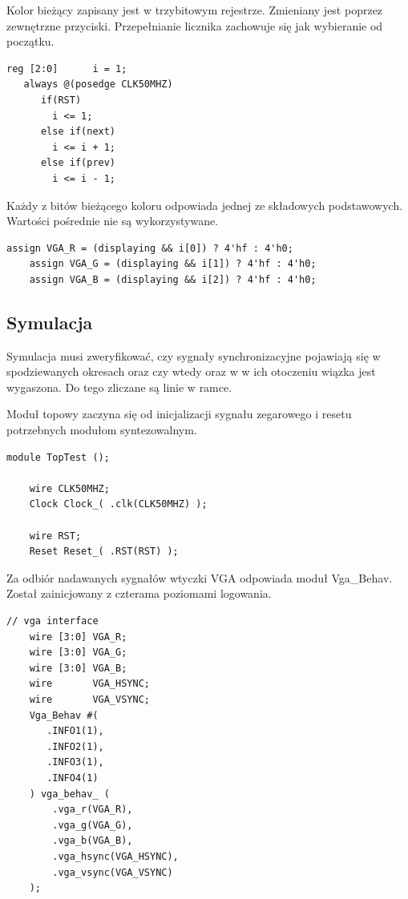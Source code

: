 \documentclass[a4paper,12pt]{article}
\begin{document}
Kolor bieżący zapisany jest w trzybitowym rejestrze. Zmieniany jest poprzez zewnętrzne przyciski. Przepełnianie licznika zachowuje się jak wybieranie od początku.
\begin{lstlisting}[label=Syncvga,caption=Sync.v,firstnumber=16]
   reg [2:0]      i = 1;
   always @(posedge CLK50MHZ)
      if(RST)
        i <= 1;
      else if(next)
        i <= i + 1;
      else if(prev)
        i <= i - 1;
\end{lstlisting}

Każdy z bitów bieżącego koloru odpowiada jednej ze składowych podstawowych. Wartości pośrednie nie są wykorzystywane.
\begin{lstlisting}[label=Syncvga,caption=Sync.v,firstnumber=25]
    assign VGA_R = (displaying && i[0]) ? 4'hf : 4'h0;
    assign VGA_G = (displaying && i[1]) ? 4'hf : 4'h0;
    assign VGA_B = (displaying && i[2]) ? 4'hf : 4'h0;
\end{lstlisting}

\subsection{Symulacja}
Symulacja musi zweryfikować, czy sygnały synchronizacyjne pojawiają się w spodziewanych okresach oraz czy wtedy oraz w w ich otoczeniu wiązka jest wygaszona. Do tego zliczane są linie w ramce.

Moduł topowy zaczyna się od inicjalizacji sygnału zegarowego i resetu potrzebnych modułom syntezowalnym.
\begin{lstlisting}[label=Syncvga,caption=Sync.v,firstnumber=3]
module TopTest ();

    wire CLK50MHZ;
    Clock Clock_( .clk(CLK50MHZ) );

    wire RST;
    Reset Reset_( .RST(RST) );
\end{lstlisting}

Za odbiór nadawanych sygnałów wtyczki VGA odpowiada moduł Vga\_Behav. Został zainicjowany z czterama poziomami logowania.
\begin{lstlisting}[label=Syncvga,caption=Sync.v,firstnumber=11]
    // vga interface
    wire [3:0] VGA_R;
    wire [3:0] VGA_G;
    wire [3:0] VGA_B;
    wire       VGA_HSYNC;
    wire       VGA_VSYNC;
    Vga_Behav #(
       .INFO1(1),
       .INFO2(1),
       .INFO3(1),
       .INFO4(1)
    ) vga_behav_ (
        .vga_r(VGA_R),
        .vga_g(VGA_G),
        .vga_b(VGA_B),
        .vga_hsync(VGA_HSYNC),
        .vga_vsync(VGA_VSYNC)
    );
\end{lstlisting}
\end{document}
